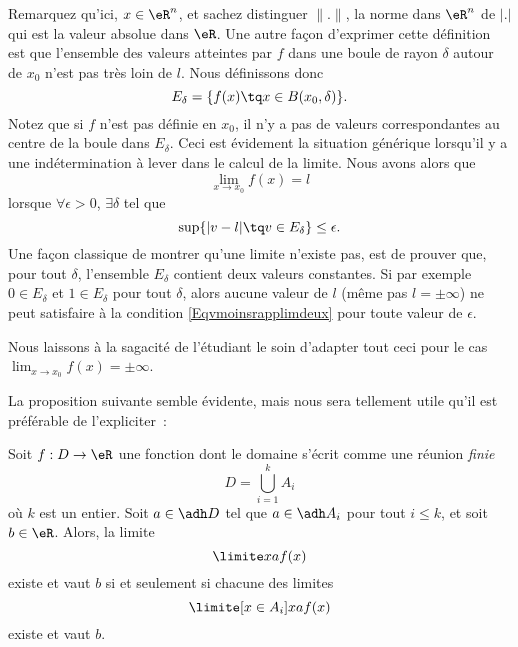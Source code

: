 Remarquez qu'ici, $x\in\eR^n$, et sachez distinguer $\| . \|$, la norme dans $\eR^n$ de $| . |$ qui est la valeur absolue dans $\eR$. Une autre façon d'exprimer cette définition est que l'ensemble des valeurs atteintes par $f$ dans une boule de rayon $\delta$ autour de $x_0$ n'est pas très loin de $l$. Nous définissons donc
\begin{equation}
    E_{\delta}=\{ f(x)\tq x\in B(x_0,\delta) \}.
\end{equation}
Notez que si $f$ n'est pas définie en $x_0$, il n'y a pas de valeurs correspondantes au centre de la boule dans $E_{\delta}$. Ceci est évidement la situation générique lorsqu'il y a une indétermination à lever dans le calcul de la limite. Nous avons alors que
\begin{equation}
    \lim_{x\to x_0}f(x)=l
\end{equation}
lorsque $\forall\epsilon>0$, $\exists\delta$ tel que 
\begin{equation}        \label{Eqvmoinsrapplimdeux}
    \sup\{ | v-l |\tq v\in E_{\delta} \}\leq\epsilon.
\end{equation}
Une façon classique de montrer qu'une limite n'existe pas, est de prouver que, pour tout $\delta$, l'ensemble $E_{\delta}$ contient deux valeurs constantes. Si par exemple $0\in E_{\delta}$ et $1\in E_{\delta}$ pour tout $\delta$, alors aucune valeur de $l$ (même pas $l=\pm\infty$) ne peut satisfaire à la condition \eqref{Eqvmoinsrapplimdeux} pour toute valeur de $\epsilon$.

Nous laissons à la sagacité de l'étudiant le soin d'adapter tout ceci pour le cas $\lim_{x\to x_0}f(x)=\pm\infty$.

La proposition suivante semble évidente, mais nous sera tellement
utile qu'il est préférable de l'expliciter~:
\begin{proposition}
Soit $f : D \to \eR$ une fonction dont le domaine
  s'écrit comme une réunion \emph{finie}
  \begin{equation*}
    D = \bigcup_{i=1}^k A_i
  \end{equation*}  
  où $k$ est un entier. Soit $a \in \adh D$ tel que $a \in \adh A_i$
  pour tout $i \leq k$, et soit $b \in \eR$. Alors, la limite
  \begin{equation*}
    \limite x a f(x)
  \end{equation*}
  existe et vaut $b$ si et seulement si chacune des limites
  \begin{equation*}
    \limite[x \in A_i] x a f(x)
  \end{equation*}
  existe et vaut $b$.
\end{proposition}

